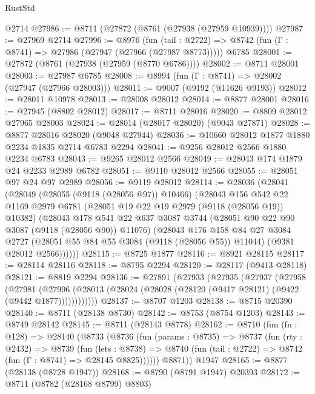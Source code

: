\begin{lexlean}{RustStd}
\begin{coremodule}
    @2714
@27986 := @8711 (@27872 (@8761 (@27938 (@27959 @10939))))
@27987 := @27969 @2714
@27996 := @8976
    (fun (tail : @2722) => @8742 (fun (Γ : @8741) => @27986 (@27947 (@27966 (@27987 @8773)))))
    @6785
@28001 := @27872 (@8761 (@27938 (@27959 (@8770 @6786))))
@28002 := @8711 @28001
@28003 := @27987 @6785
@28008 := @8994 (fun (Γ : @8741) => @28002 (@27947 (@27966 @28003)))
@28011 := @9007 (@9192 (@11626 @9193))
@28012 := @28011 @10978
@28013 := @28008 @28012
@28014 := @8877 @28001
@28016 := @27945 (@8802 @28012)
@28017 := @8711 @28016
@28020 := @8809 @28012 @27965 @28003
@28024 := @28014 (@28017 @28020) (@9043 @27871)
@28028 := @8877 @28016 @28020 (@9048 @27944)
@28036 := @10660 @28012 @1877 @1880 @2234 @1835 @2714 @6783 @2294
@28041 := @9256 @28012 @2566 @1880 @2234 @6783
@28043 := @9265 @28012 @2566
@28049 := @28043 @174 @1879 @24 @2233 @2989 @6782
@28051 := @9110 @28012 @2566
@28055 := @28051 @97 @24 @97 @2989
@28056 := @9119 @28012
@28114 := @28036
    (@28041
      (@28049
        (@28055 (@9118 (@28056 @97)) @10466)
        (@28043
          @156
          @542
          @22
          @1169
          @2979
          @6781
          (@28051 @19 @22 @19 @2979 (@9118 (@28056 @19)) @10382)
          (@28043
            @178
            @541
            @22
            @637
            @3087
            @3744
            (@28051 @90 @22 @90 @3087 (@9118 (@28056 @90)) @11076)
            (@28043
              @176
              @158
              @84
              @27
              @3084
              @2727
              (@28051 @55 @84 @55 @3084 (@9118 (@28056 @55)) @11044)
              (@9381 @28012 @2566))))))
@28115 := @8725 @1877
@28116 := @8921 @28115
@28117 := @28114 @28116
@28118 := @8795 @2294
@28120 := @28117 (@9413 @28118)
@28121 := @8819 @2294
@28136 := @27891
    (@27933
      (@27935
        (@27937
          (@27958
            (@27981
              (@27996 (@28013 (@28024 (@28028 (@28120 (@9417 @28121) (@9422 (@9442 @1877))))))))))))
@28137 := @8707 @1203
@28138 := @8715 @20390
@28140 := @8711 (@28138 @8730)
@28142 := @8753 (@8754 @1203)
@28143 := @8749 @28142
@28145 := @8711 (@28143 @8778)
@28162 := @8710
    (fun (fn : @128) =>
    @28140
      (@8733
        (@8736
          (fun (params : @8735) =>
          @8737
            (fun (rty : @2432) =>
            @8739
              (fun (lets : @8738) =>
              @8740 (fun (tail : @2722) => @8742 (fun (Γ : @8741) => @28145 @8825))))))
        @8871))
    @1947
@28165 := @8877 (@28138 (@8728 @1947))
@28168 := @8790 (@8791 @1947) @20393
@28172 := @8711 (@8782 (@28168 @8799) @8803)

\end{coremodule}
\end{lexlean}
